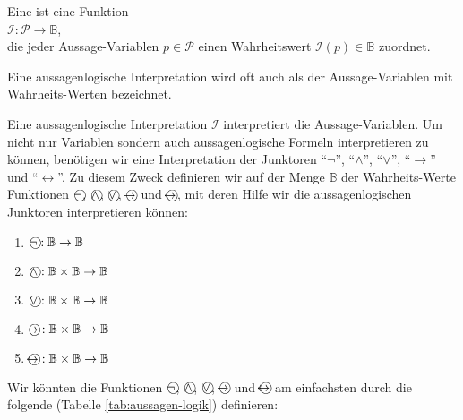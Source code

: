 \begin{Definition}
  Eine 
   ist eine Funktion \\[0.2cm]
  \hspace*{1.3cm} $\mathcal{I}:\mathcal{P} \rightarrow \mathbb{B}$, \\[0.2cm]
  die jeder Aussage-Variablen $p\in \mathcal{P}$ einen Wahrheitswert $\mathcal{I}(p) \in \mathbb{B}$ zuordnet.
  \eox
\end{Definition}
Eine aussagenlogische Interpretation wird oft auch als  der
Aussage-Variablen mit Wahr\-heits-Werten bezeichnet.  

Eine aussagenlogische Interpretation $\mathcal{I}$ interpretiert die Aussage-Variablen.
Um nicht nur Variablen sondern auch aussagenlogische Formeln interpretieren zu können, 
benötigen wir eine
Interpretation der Junktoren ``$\neg$'', ``$\wedge$'', ``$\vee$'', ``$\rightarrow$'' und
``$\leftrightarrow$''.  Zu diesem Zweck definieren wir auf der Menge $\mathbb{B}$ der Wahr\-heits-Werte
Funktionen
$\circneg$, $\circwedge$, $\circvee$, $\circright$ und $\circleftright$,
mit deren Hilfe wir die aussagenlogischen Junktoren interpretieren können:
\begin{enumerate}
\item $\circneg: \mathbb{B} \rightarrow \mathbb{B}$ \index{$\circneg$}
\item $\circwedge: \mathbb{B} \times \mathbb{B} \rightarrow \mathbb{B}$ \index{$\circwedge$}
\item $\circvee: \mathbb{B} \times \mathbb{B} \rightarrow \mathbb{B}$ \index{$\circvee$}
\item $\circright: \mathbb{B} \times \mathbb{B} \rightarrow \mathbb{B}$ \index{$\circright$}
\item $\circleftright: \mathbb{B} \times \mathbb{B} \rightarrow \mathbb{B}$ \index{$\circleftright$}
\end{enumerate}
Wir könnten die Funktionen $\circneg$, $\circwedge$, $\circvee$, $\circright$ und $\circleftright$ am
einfachsten durch die folgende   (Tabelle
\ref{tab:aussagen-logik}) definieren:   


